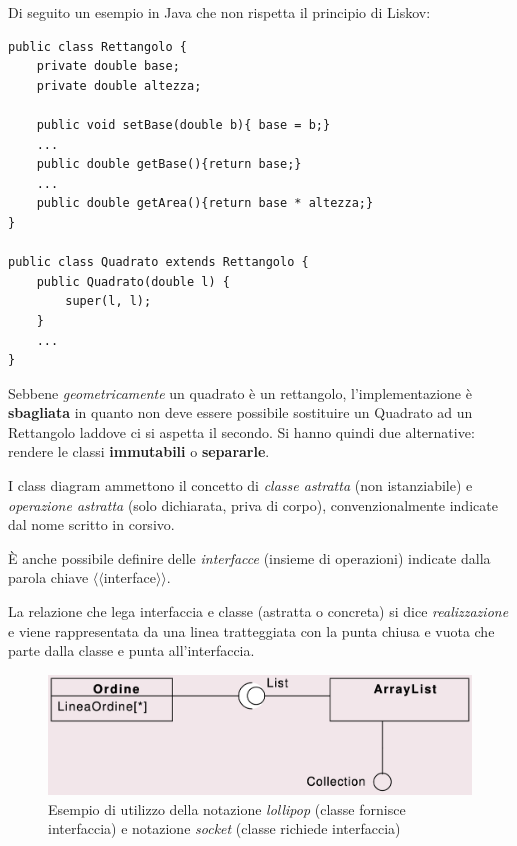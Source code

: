 \newpage

Di seguito un esempio in Java che non rispetta il principio di Liskov:
\begin{verbatim}
public class Rettangolo {
    private double base;
    private double altezza;

    public void setBase(double b){ base = b;}
    ...
    public double getBase(){return base;}
    ...
    public double getArea(){return base * altezza;}
}

public class Quadrato extends Rettangolo {
    public Quadrato(double l) {
        super(l, l);
    }
    ...
}
\end{verbatim}
Sebbene \textit{geometricamente} un quadrato è un rettangolo, l'implementazione è \textbf{sbagliata} in quanto non deve essere possibile sostituire un Quadrato ad un Rettangolo laddove ci si aspetta il secondo. Si hanno quindi due alternative: rendere le classi \textbf{immutabili} o \textbf{separarle}.

I class diagram ammettono il concetto di \textit{classe astratta} (non istanziabile) e \textit{operazione astratta} (solo dichiarata, priva di corpo), convenzionalmente indicate dal nome scritto in corsivo.

È anche possibile definire delle \textit{interfacce} (insieme di operazioni) indicate dalla parola chiave $\langle\langle$interface$\rangle\rangle$.

La relazione che lega interfaccia e classe (astratta o concreta) si dice \textit{realizzazione} e viene rappresentata da una linea tratteggiata con la punta chiusa e vuota che parte dalla classe e punta all'interfaccia.

\begin{figure}[H]
    \centering
    \includegraphics[width=0.75\linewidth]{assets/UML/class/class-9.png}
    \caption{Esempio di utilizzo della notazione \textit{lollipop} (classe fornisce interfaccia) e notazione \textit{socket} (classe richiede interfaccia)}
\end{figure}

